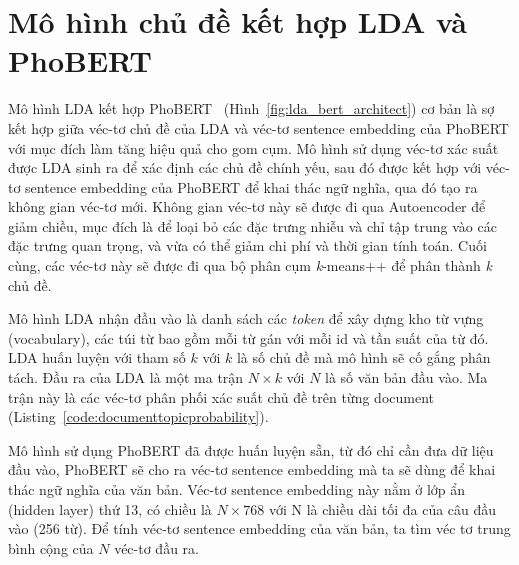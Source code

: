 \section{Mô hình chủ đề kết hợp LDA và PhoBERT}
\label{chap:lda_phobert}
Mô hình LDA kết hợp PhoBERT~\cite{lamGomCumVan2021} (Hình~\ref{fig:lda_bert_architect}) cơ bản là sợ kết hợp giữa véc-tơ chủ đề của LDA và véc-tơ sentence embedding của PhoBERT với mục đích làm tăng hiệu quả cho gom cụm. Mô hình sử dụng véc-tơ xác suất được LDA sinh ra để xác định các chủ đề chính yếu, sau đó được kết hợp với véc-tơ sentence embedding của PhoBERT để khai thác ngữ nghĩa, qua đó tạo ra không gian véc-tơ mới. Không gian véc-tơ này sẽ được đi qua Autoencoder để giảm chiều, mục đích là để loại bỏ các đặc trưng nhiễu và chỉ tập trung vào các đặc trưng quan trọng, và vừa có thể giảm chi phí và thời gian tính toán. Cuối cùng, các véc-tơ này sẽ được đi qua bộ phân cụm \textit{k}-means++ để phân thành \textit{k} chủ đề.


Mô hình LDA nhận đầu vào là danh sách các \textit{token} để xây dựng kho từ vựng (vocabulary), các túi từ bao gồm mỗi từ gán với mỗi id và tần suất của từ đó. LDA huấn luyện với tham số $k$ với $k$ là số chủ đề mà mô hình sẽ cố gắng phân tách. Đầu ra của LDA là một ma trận $N \times k$ với $N$ là số văn bản đầu vào. Ma trận này là các véc-tơ phân phối xác suất chủ đề trên từng \acrshort{document} (Listing~\ref{code:documenttopicprobability}).

Mô hình sử dụng PhoBERT đã được huấn luyện sẵn, từ đó chỉ cần đưa dữ liệu đầu vào, PhoBERT sẽ cho ra véc-tơ sentence embedding mà ta sẽ dùng để khai thác ngữ nghĩa của văn bản. Véc-tơ sentence embedding này nằm ở lớp ẩn (hidden layer) thứ 13, có chiều là $N \times 768$ với N là chiều dài tối đa của câu đầu vào (256 từ). Để tính véc-tơ sentence embedding của văn bản, ta tìm véc tơ trung bình cộng của $N$ véc-tơ đầu ra.

